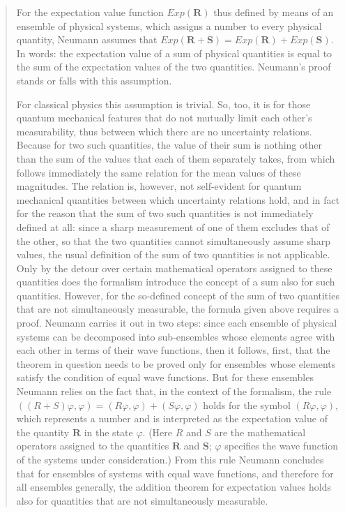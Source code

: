 \documentclass[11pt]{article}
\begin{document}
\begin{quote}
For the expectation value function $Exp(\textbf{R})$ thus defined by means of an ensemble of physical systems, which assigns a number to every physical quantity, Neumann assumes that $Exp(\textbf{R}+\textbf{S}) = Exp(\textbf{R})+Exp(\textbf{S})$. In words: the expectation value of a sum of physical quantities is equal to the sum of the expectation values of the two quantities. Neumann's proof stands or falls with this assumption.

For classical physics this assumption is trivial. So, too, it is for those quantum
mechanical features that do not mutually limit each other's measurability, thus between
which there are no uncertainty relations. Because for two such quantities, the
value of their sum is nothing other than the sum of the values that each of them
separately takes, from which follows immediately the same relation for the mean
values of these magnitudes. The relation is, however, not self-evident for quantum
mechanical quantities between which uncertainty relations hold, and in fact for the
reason that the sum of two such quantities is not immediately defined at all: since a
sharp measurement of one of them excludes that of the other, so that the two quantities
cannot simultaneously assume sharp values, the usual definition of the sum
of two quantities is not applicable. Only by the detour over certain mathematical
operators assigned to these quantities does the formalism introduce the concept of
a sum also for such quantities.
However, for the so-defined concept of the sum of two quantities that are not
simultaneously measurable, the formula given above requires a proof. Neumann carries
it out in two steps: since each ensemble of physical systems can be decomposed
into sub-ensembles whose elements agree with each other in terms of their wave
functions, then it follows, first, that the theorem in question needs to be proved only
for ensembles whose elements satisfy the condition of equal wave functions. But for
these ensembles Neumann relies on the fact that, in the context of the formalism, the
rule $((R+S)\varphi, \varphi) = (R\varphi, \varphi)+(S\varphi, \varphi)$ holds for the symbol $(R\varphi, \varphi)$, which represents
a number and is interpreted as the expectation value of the quantity $\textbf{R}$ in the state
$\varphi$. (Here $R$ and $S$ are the mathematical operators assigned to the quantities $\textbf{R}$ and
$\textbf{S}$; $\varphi$ specifies the wave function of the systems under consideration.) From this rule
Neumann concludes that for ensembles of systems with equal wave functions, and
therefore for all ensembles generally, the addition theorem for expectation values
holds also for quantities that are not simultaneously measurable.

\end{quote}
\end{document}
